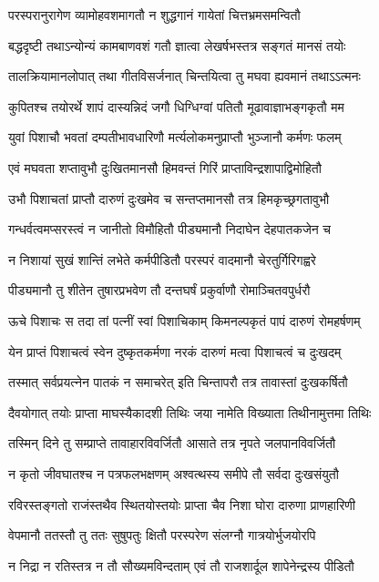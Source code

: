 \twolineshloka
{परस्परानुरागेण व्यामोहवशमागतौ}
{न शुद्धगानं गायेतां चित्तभ्रमसमन्वितौ}%

\twolineshloka
{बद्धदृष्टी तथाऽन्योन्यं कामबाणवशं गतौ}
{ज्ञात्वा लेखर्षभस्तत्र सङ्गतं मानसं तयोः}%

\twolineshloka
{तालक्रियामानलोपात् तथा गीतविसर्जनात्}
{चिन्तयित्वा तु मघवा ह्यवमानं तथाऽऽत्मनः}%

\twolineshloka
{कुपितश्च तयोरर्थे शापं दास्यन्निदं जगौ}
{धिग्धिग्वां पतितौ मूढावाज्ञाभङ्गकृतौ मम}%

\twolineshloka
{युवां पिशाचौ भवतां दम्पतीभावधारिणौ}
{मर्त्यलोकमनुप्राप्तौ भुञ्जानौ कर्मणः फलम्}%

\twolineshloka
{एवं मघवता शप्तावुभौ दुःखितमानसौ}
{हिमवन्तं गिरिं प्राप्ताविन्द्रशापाद्विमोहितौ}%

\twolineshloka
{उभौ पिशाचतां प्राप्तौ दारुणं दुःखमेव च}
{सन्तप्तमानसौ तत्र हिमकृच्छ्रगतावुभौ}%

\twolineshloka
{गन्धर्वत्वमप्सरस्त्वं न जानीतो विमौहितौ}
{पीड्यमानौ निदाघेन देहपातकजेन च}%

\twolineshloka
{न निशायां सुखं शान्तिं लभेते कर्मपीडितौ}
{परस्परं वादमानौ चेरतुर्गिरिगह्वरे}%

\twolineshloka
{पीड्यमानौ तु शीतेन तुषारप्रभवेण तौ}
{दन्तघर्षं प्रकुर्वाणौ रोमाञ्चितवपुर्धरौ}%

\twolineshloka
{ऊचे पिशाचः स तदा तां पत्नीं स्वां पिशाचिकाम्}
{किमनल्पकृतं पापं दारुणं रोमहर्षणम्}%

\twolineshloka
{येन प्राप्तं पिशाचत्वं स्वेन दुष्कृतकर्मणा}
{नरकं दारुणं मत्वा पिशाचत्वं च दुःखदम्}%

\twolineshloka
{तस्मात् सर्वप्रयत्नेन पातकं न समाचरेत्}
{इति चिन्तापरौ तत्र तावास्तां दुःखकर्षितौ}%

\twolineshloka
{दैवयोगात् तयोः प्राप्ता माघस्यैकादशी तिथिः}
{जया नामेति विख्याता तिथीनामुत्तमा तिथिः}%

\twolineshloka
{तस्मिन् दिने तु सम्प्राप्ते तावाहारविवर्जितौ}
{आसाते तत्र नृपते जलपानविवर्जितौ}%

\twolineshloka
{न कृतो जीवघातश्च न पत्रफलभक्षणम्}
{अश्वत्थस्य समीपे तौ सर्वदा दुःखसंयुतौ}%

\twolineshloka
{रविरस्तङ्गतो राजंस्तथैव स्थितयोस्तयोः}
{प्राप्ता चैव निशा घोरा दारुणा प्राणहारिणी}%

\twolineshloka
{वेपमानौ ततस्तौ तु ततः सुषुपतुः क्षितौ}
{परस्परेण संलग्नौ गात्रयोर्भुजयोरपि}%

\twolineshloka
{न निद्रा न रतिस्तत्र न तौ सौख्यमविन्दताम्}
{एवं तौ राजशार्दूल शापेनेन्द्रस्य पीडितौ}%

